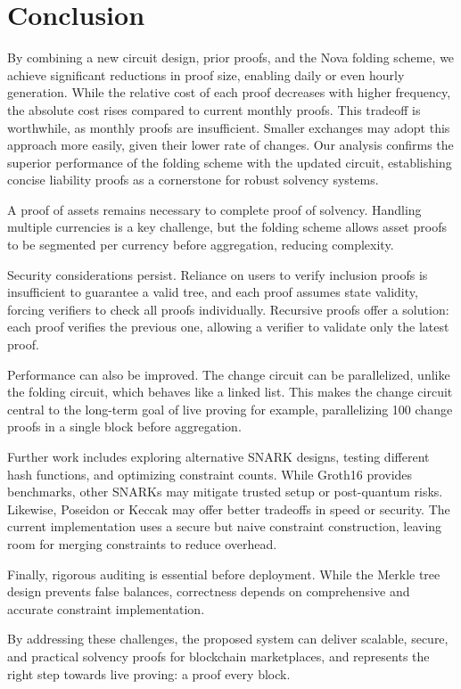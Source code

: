 
\chapter{Conclusion}

By combining a new circuit design, prior proofs, and the Nova folding scheme, we achieve significant reductions in proof size, enabling daily or even hourly generation.
While the relative cost of each proof decreases with higher frequency, the absolute cost rises compared to current monthly proofs. This tradeoff is worthwhile, as monthly proofs are insufficient. 
Smaller exchanges may adopt this approach more easily, given their lower rate of changes.
Our analysis confirms the superior performance of the folding scheme with the updated circuit, establishing concise liability proofs as a cornerstone for robust solvency systems.

A proof of assets remains necessary to complete proof of solvency. Handling multiple currencies is a key challenge, but the folding scheme allows asset proofs to be segmented per currency before aggregation, reducing complexity.

Security considerations persist. Reliance on users to verify inclusion proofs is insufficient to guarantee a valid tree, and each proof assumes state validity, forcing verifiers to check all proofs individually. 
Recursive proofs offer a solution: each proof verifies the previous one, allowing a verifier to validate only the latest proof.

Performance can also be improved. The change circuit can be parallelized, unlike the folding circuit, which behaves like a linked list. 
This makes the change circuit central to the long-term goal of live proving for example, parallelizing 100 change proofs in a single block before aggregation.

Further work includes exploring alternative SNARK designs, testing different hash functions, and optimizing constraint counts. While Groth16 provides benchmarks, other SNARKs may mitigate trusted setup or post-quantum risks. 
Likewise, Poseidon or Keccak may offer better tradeoffs in speed or security. 
The current implementation uses a secure but naive constraint construction, leaving room for merging constraints to reduce overhead.

Finally, rigorous auditing is essential before deployment. While the Merkle tree design prevents false balances, correctness depends on comprehensive and accurate constraint implementation.

By addressing these challenges, the proposed system can deliver scalable, secure, and practical solvency proofs for blockchain marketplaces, and represents the right step towards live proving: a proof every block.